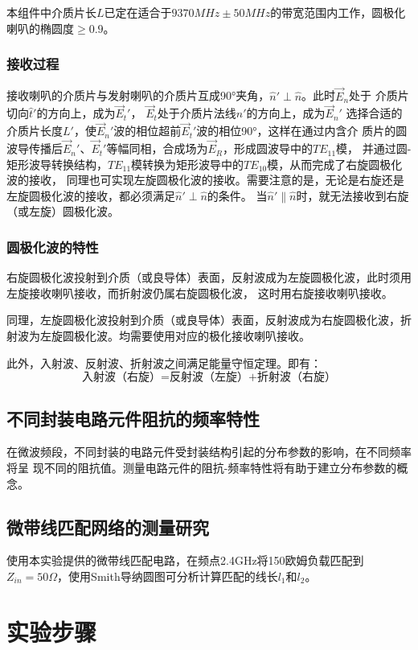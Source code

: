 \documentclass[UTF8]{ctexart}
\begin{document}
本组件中介质片长$L$已定在适合于$9370MHz \pm 50MHz$的带宽范围内工作，圆极化喇叭的椭圆度$\geq 0.9$。
\subsubsection{接收过程}

接收喇叭的介质片与发射喇叭的介质片互成90°夹角，$\hat{n}'\perp\hat{n}$。此时$\vec{E}_n$处于
介质片切向$\hat{t}'$的方向上，成为$\vec{E}_t'$， $\vec{E}_t$处于介质片法线$\hat{n}'$的方向上，成为$\vec{E}_n'$
选择合适的介质片长度$L'$，使$\vec{E}_n'$波的相位超前$\vec{E}_t'$波的相位90°，这样在通过内含介
质片的圆波导传播后$\vec{E}_n'$、$\vec{E}_t'$等幅同相，合成场为$\vec{E}_R$，形成圆波导中的$TE_{11}$模，
并通过圆-矩形波导转换结构，$TE_{11}$模转换为矩形波导中的$TE_{10}$模，从而完成了右旋圆极化波的接收，
同理也可实现左旋圆极化波的接收。需要注意的是，无论是右旋还是左旋圆极化波的接收，都必须满足$\hat{n}'\perp\hat{n}$的条件。
当$\hat{n}'\parallel\hat{n}$时，就无法接收到右旋（或左旋）圆极化波。

\subsubsection{圆极化波的特性}

右旋圆极化波投射到介质（或良导体）表面，反射波成为左旋圆极化波，此时须用左旋接收喇叭接收，而折射波仍属右旋圆极化波，
这时用右旋接收喇叭接收。

同理，左旋圆极化波投射到介质（或良导体）表面，反射波成为右旋圆极化波，折射波为左旋圆极化波。均需要使用对应的极化接收喇叭接收。

此外，入射波、反射波、折射波之间满足能量守恒定理。即有：
$$
\mbox{入射波（右旋）=反射波（左旋）+折射波（右旋）}
$$
\subsection{不同封装电路元件阻抗的频率特性}
在微波频段，不同封装的电路元件受封装结构引起的分布参数的影响，在不同频率将呈
现不同的阻抗值。测量电路元件的阻抗-频率特性将有助于建立分布参数的概念。

\subsection{微带线匹配网络的测量研究}
使用本实验提供的微带线匹配电路，在频点2.4GHz将150欧姆负载匹配到$Z_{in}=50\Omega$，使用Smith导纳圆图可分析计算匹配的线长$l_1$和$l_2$。


\section{实验步骤}
\end{document}
